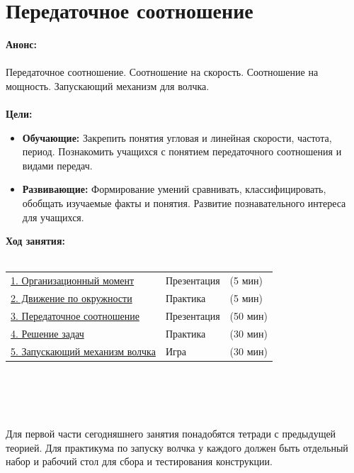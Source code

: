 \chapter{\label{lesson6}Передаточное соотношение}
{\bfseries Анонс:}\\\\
Передаточное соотношение. Соотношение на скорость. Соотношение на мощность. Запускающий механизм для волчка.\\\\
{\bfseries Цели:}
\begin{itemize}
	\item{}{\bfseries Обучающие:} Закрепить понятия угловая и линейная скорости, частота, период. Познакомить учащихся с понятием передаточного соотношения и видами передач.
	\item{}{\bfseries Развивающие:} Формирование умений сравнивать, классифицировать, обобщать изучаемые факты и понятия. Развитие познавательного интереса для учащихся.\\
\end{itemize}	
{\bfseries Ход занятия:}\\\\
\begin{tabular}{lll}
	\hyperlink{lesson6x1}{1. Организационный момент} & Презентация & (5 мин)\\
	\hyperlink{lesson6x2}{2. Движение по окружности} & Практика & (5 мин) \\
	\hyperlink{lesson6x3}{3. Передаточное соотношение} & Презентация & (50 мин) \\
	\hyperlink{lesson6x4}{4. Решение задач} & Практика & (30 мин)\\
	\hyperlink{lesson6x5}{5. Запускающий механизм волчка} & Игра & (30 мин)
\end{tabular}\\\\

{\hypertarget{lesson6x1}{}}\\\\

Для первой части сегодняшнего занятия понадобятся тетради с предыдущей теорией. Для практикума по запуску волчка у каждого должен быть отдельный набор и рабочий стол для сбора и тестирования конструкции.\\\\

{\hypertarget{lesson6x2}{}}\\\\	

